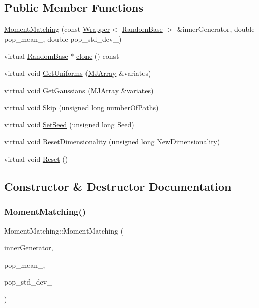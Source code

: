 \subsection*{Public Member Functions}
\begin{DoxyCompactItemize}
\item 
\hyperlink{classMomentMatching_aada4b4b3c20cfaa7f5937d2c0b0b0b8a}{Moment\+Matching} (const \hyperlink{classWrapper}{Wrapper}$<$ \hyperlink{classRandomBase}{Random\+Base} $>$ \&inner\+Generator, double pop\+\_\+mean\+\_\+, double pop\+\_\+std\+\_\+dev\+\_\+)
\item 
virtual \hyperlink{classRandomBase}{Random\+Base} $\ast$ \hyperlink{classMomentMatching_a21274179f7a0cb3207b690e2e3da6c3a}{clone} () const
\item 
virtual void \hyperlink{classMomentMatching_ae07e9d85774d2ab2f4c877313e986892}{Get\+Uniforms} (\hyperlink{classMJArray}{M\+J\+Array} \&variates)
\item 
virtual void \hyperlink{classMomentMatching_ab3977dfbd2a433e0874e8a2501b1b6ac}{Get\+Gaussians} (\hyperlink{classMJArray}{M\+J\+Array} \&variates)
\item 
virtual void \hyperlink{classMomentMatching_a14d56de714eb1a9025f0ff1ea8956931}{Skip} (unsigned long number\+Of\+Paths)
\item 
virtual void \hyperlink{classMomentMatching_a3700491fdae597126aab18fb5f42de04}{Set\+Seed} (unsigned long Seed)
\item 
virtual void \hyperlink{classMomentMatching_abf820b373aed3833b07408c53862f69b}{Reset\+Dimensionality} (unsigned long New\+Dimensionality)
\item 
virtual void \hyperlink{classMomentMatching_ac1c10b8bc2fc4b8b1564af89725c27ca}{Reset} ()
\end{DoxyCompactItemize}


\subsection{Constructor \& Destructor Documentation}
\hypertarget{classMomentMatching_aada4b4b3c20cfaa7f5937d2c0b0b0b8a}{}\label{classMomentMatching_aada4b4b3c20cfaa7f5937d2c0b0b0b8a} 
\subsubsection{\texorpdfstring{Moment\+Matching()}{MomentMatching()}}
{\footnotesize\ttfamily Moment\+Matching\+::\+Moment\+Matching (\begin{DoxyParamCaption}\item[{const \hyperlink{classWrapper}{Wrapper}$<$ \hyperlink{classRandomBase}{Random\+Base} $>$ \&}]{inner\+Generator,  }\item[{double}]{pop\+\_\+mean\+\_\+,  }\item[{double}]{pop\+\_\+std\+\_\+dev\+\_\+ }\end{DoxyParamCaption})}



